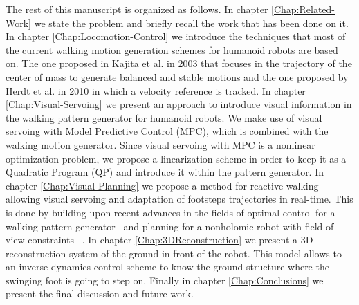 The rest of this manuscript is organized as follows. In chapter \ref{Chap:Related-Work} we state the problem and briefly recall the work that has been done on it. In chapter \ref{Chap:Locomotion-Control} we introduce the techniques that most of the current walking motion generation schemes for humanoid robots are based on. The one proposed in Kajita et al. in 2003 \citep{Kajita2003} that focuses in the trajectory of the center of mass to generate balanced and stable motions and the one proposed by Herdt et al. in 2010 \citep{HerdtAR2010} in which a velocity reference is tracked. In chapter \ref{Chap:Visual-Servoing} we present an approach to introduce visual information in the walking pattern generator for humanoid robots. We make use of visual servoing with Model Predictive Control (MPC), which is combined with the walking motion generator. Since visual servoing with MPC is a nonlinear optimization problem, we propose a linearization scheme in order to keep it as a Quadratic Program (QP) and introduce it within the pattern generator. In chapter \ref{Chap:Visual-Planning} we propose a method for reactive walking allowing visual servoing and adaptation of footsteps trajectories in real-time. This is done by building upon recent advances in the fields of optimal control for a walking pattern generator~\citep{HerdtAR2010} and planning for a nonholomic robot with field-of-view constraints ~\citep{Salaris:2010}. In chapter \ref{Chap:3DReconstruction} we present a 3D reconstruction system of the ground in front of the robot. This model allows to an inverse dynamics control scheme to know the ground structure where the swinging foot is going to step on. Finally in chapter \ref{Chap:Conclusions} we present the final discussion and future work.


